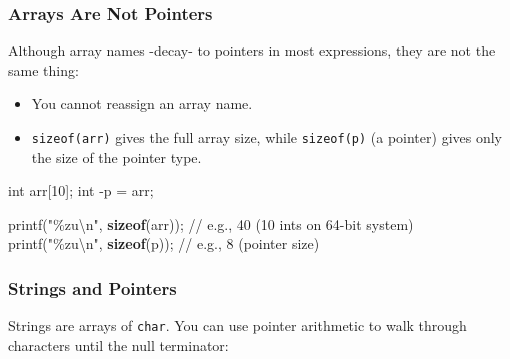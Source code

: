 \documentclass[
  letterpaper,
  DIV=11,
  numbers=noendperiod]{scrreprt}
\newenvironment{Shaded}{\begin{snugshade}}{\end{snugshade}}
\newcommand{\CommentTok}[1]{\textcolor[rgb]{0.37,0.37,0.37}{#1}}
\newcommand{\DataTypeTok}[1]{\textcolor[rgb]{0.68,0.00,0.00}{#1}}
\newcommand{\DecValTok}[1]{\textcolor[rgb]{0.68,0.00,0.00}{#1}}
\newcommand{\KeywordTok}[1]{\textcolor[rgb]{0.00,0.23,0.31}{\textbf{#1}}}
\newcommand{\NormalTok}[1]{\textcolor[rgb]{0.00,0.23,0.31}{#1}}
\newcommand{\OperatorTok}[1]{\textcolor[rgb]{0.37,0.37,0.37}{#1}}
\newcommand{\SpecialCharTok}[1]{\textcolor[rgb]{0.37,0.37,0.37}{#1}}
\newcommand{\StringTok}[1]{\textcolor[rgb]{0.13,0.47,0.30}{#1}}
\providecommand{\tightlist}{%
  \setlength{\itemsep}{0pt}\setlength{\parskip}{0pt}}
\begin{document}
\subsubsection{Arrays Are Not Pointers}\label{arrays-are-not-pointers}

Although array names -decay- to pointers in most expressions, they are
not the same thing:

\begin{itemize}
\tightlist
\item
  You cannot reassign an array name.
\item
  \texttt{sizeof(arr)} gives the full array size, while
  \texttt{sizeof(p)} (a pointer) gives only the size of the pointer
  type.
\end{itemize}

\begin{Shaded}
\begin{Highlighting}[]
\DataTypeTok{int}\NormalTok{ arr}\OperatorTok{[}\DecValTok{10}\OperatorTok{];}
\DataTypeTok{int} \OperatorTok{{-}}\NormalTok{p }\OperatorTok{=}\NormalTok{ arr}\OperatorTok{;}

\NormalTok{printf}\OperatorTok{(}\StringTok{"}\SpecialCharTok{\%zu\textbackslash{}n}\StringTok{"}\OperatorTok{,} \KeywordTok{sizeof}\OperatorTok{(}\NormalTok{arr}\OperatorTok{));} \CommentTok{// e.g., 40 (10 ints on 64{-}bit system)}
\NormalTok{printf}\OperatorTok{(}\StringTok{"}\SpecialCharTok{\%zu\textbackslash{}n}\StringTok{"}\OperatorTok{,} \KeywordTok{sizeof}\OperatorTok{(}\NormalTok{p}\OperatorTok{));}   \CommentTok{// e.g., 8 (pointer size)}
\end{Highlighting}
\end{Shaded}

\subsubsection{Strings and Pointers}\label{strings-and-pointers}

Strings are arrays of \texttt{char}. You can use pointer arithmetic to
walk through characters until the null terminator:
\end{document}
